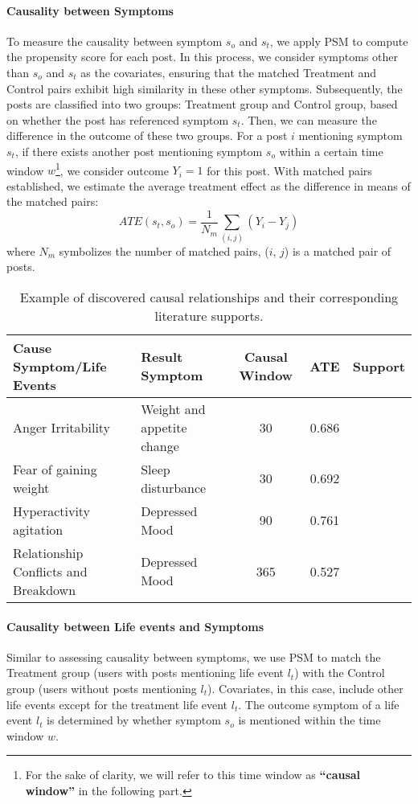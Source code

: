 \paragraph{Causality between Symptoms}
To measure the causality between symptom $s_o$ and $s_t$, we apply PSM to compute the propensity score for each post. In this process, we consider symptoms other than $s_o$ and $s_t$ as the covariates, ensuring that the matched Treatment and Control pairs exhibit high similarity in these other symptoms. Subsequently, the posts are classified into two groups: Treatment group and Control group, based on whether the post has referenced symptom $s_t$. Then, we can measure the difference in the outcome of these two groups. For a post $i$ mentioning symptom $s_t$, if there exists another post mentioning symptom $s_o$ within a certain time window $w$\footnote{For the sake of clarity, we will refer to this time window as \textbf{``causal window''} in the following part.\label{footnote:causal_window}}, we consider outcome $Y_i=1$ for this post. 
With matched pairs established, we estimate the average treatment effect as the difference in means of the matched pairs:
$$ATE(s_t, s_o) = \frac{1}{N_m} \sum_{(i, j)} \left( Y_i - Y_j \right)$$ 
where $N_m$ symbolizes the number of matched pairs, ($i$, $j$) is a matched pair of posts.

\begin{table*}[th]
    \small
    \centering
    \begin{tabular}{l|l|c|c|c}
    \hline
    Cause Symptom/Life Events & Result Symptom & Causal Window & ATE & Support  \\ 
    \hline
     Anger Irritability  & Weight and appetite change & 30 & 0.686 & \citet{vanzhula2019illness} \\
     Fear of gaining weight  & Sleep disturbance & 30 & 0.692 & \citet{vanzhula2019illness}	 \\
    Hyperactivity agitation & Depressed Mood & 90 & 0.761 & \citet{boschloo2015network} \\
    Relationship Conflicts and Breakdown & Depressed Mood & 365 & 0.527 & \citet{konac2021comorbidity} \\
    \hline
    \end{tabular}
    \caption{Example of discovered causal relationships and their corresponding literature supports.}
    \label{tab:causal_analysis}
\end{table*}

\paragraph{Causality between Life events and Symptoms}
Similar to assessing causality between symptoms, we use PSM to match the Treatment group (users with posts mentioning life event $l_t$) with the Control group (users without posts mentioning $l_t$). Covariates, in this case, include other life events except for the treatment life event $l_t$. The outcome symptom of a life event $l_t$ is determined by whether symptom $s_o$ is mentioned within the time window $w$.         


